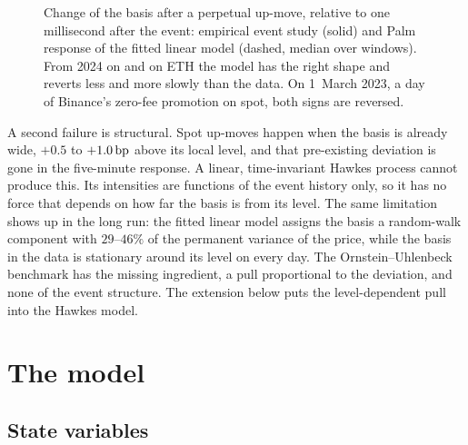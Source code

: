 \documentclass[a4paper,11pt]{article}
\begin{document}
\begin{figure}[htbp]
\caption{Change of the basis after a perpetual up-move, relative to one millisecond after the event: empirical event study (solid) and Palm response of the fitted linear model (dashed, median over windows). From 2024 on and on ETH the model has the right shape and reverts less and more slowly than the data. On 1~March 2023, a day of Binance's zero-fee promotion on spot, both signs are reversed.}
\label{fig:alldays}
\end{figure}

A second failure is structural. Spot up-moves happen when the basis is already wide, $+0.5$ to $+1.0\,\mathrm{bp}$ above its local level, and that pre-existing deviation is gone in the five-minute response. A linear, time-invariant Hawkes process cannot produce this. Its intensities are functions of the event history only, so it has no force that depends on how far the basis is from its level. The same limitation shows up in the long run: the fitted linear model assigns the basis a random-walk component with $29$--$46\%$ of the permanent variance of the price, while the basis in the data is stationary around its level on every day. The Ornstein--Uhlenbeck benchmark has the missing ingredient, a pull proportional to the deviation, and none of the event structure. The extension below puts the level-dependent pull into the Hawkes model.

\section{The model}

\subsection{State variables}
\end{document}

